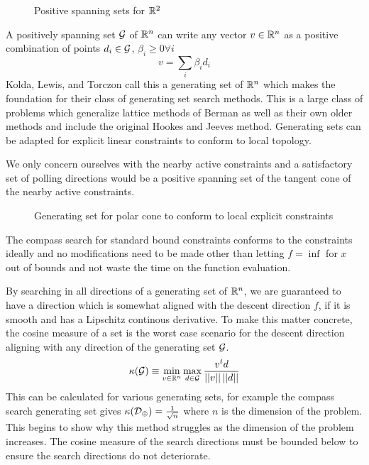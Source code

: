 \begin{figure}
\centering

\caption{Positive spanning sets for $\mathbb{R}^{2}$}
\end{figure}

A positively spanning set $\mathcal{G}$ of $\mathbb{R}^{n}$ can write any vector $v \in \mathbb{R}^{n}$ as a positive combination of points $d_i \in \mathcal{G}$,  $\beta_i \geq 0 \forall i$
\begin{equation}
v = \sum_i \beta_i d_i
\end{equation}
Kolda, Lewis, and Torczon \cite{kolda_2003} call this a generating set of $\mathbb{R}^{n}$ which makes the foundation for their class of generating set search methods.  This is a large class of problems which generalize lattice methods of Berman \cite{berman_1966} \cite{berman_1969} as well as their own older methods \cite{torczon_1997} \cite{lewis_2000} and include the original Hookes and Jeeves method\cite{hooke_1961}.  Generating sets can be adapted for explicit linear constraints to conform to local topology.

We only concern ourselves with the nearby active constraints and a satisfactory set of polling directions would be a positive spanning set of the tangent cone of the nearby active constraints. 
\begin{figure}
\centering

\caption{Generating set for polar cone to conform to local explicit constraints}
\end{figure}
The compass search for standard bound constraints conforms to the constraints ideally and no modifications need to be made other than letting $f = \inf $ for $x$ out of bounds and not waste the time on the function evaluation.


By searching in all directions of a generating set of $\mathbb{R}^{n}$, we are guaranteed to have a direction which is somewhat aligned with the descent direction $f$, if it is smooth and has a Lipschitz continous derivative.  To make this matter concrete, the cosine measure of a set is the worst case scenario for the descent direction aligning with any direction of the generating set $\mathcal{G}$.
\begin{equation}\label{kappa}
\kappa ( \mathcal{G}) \equiv \min_{v \in \mathbb{R}^{n}} \max_{d \in \mathcal{G}} \frac{v^t d}{\left| \left| {v} \right| \right| \left| \left| {d} \right| \right|}
\end{equation}
This can be calculated for various generating sets, for example the compass search generating set gives $\kappa(\mathcal{D}_\oplus) = \frac{1}{\sqrt{n}}$ where $n$ is the dimension of the problem.  This begins to show why this method struggles as the dimension of the problem increases.  The cosine measure of the search directions must be bounded below to ensure the search directions do not deteriorate.

